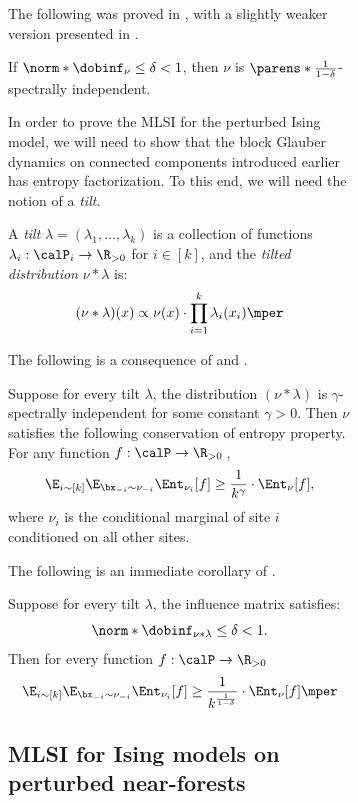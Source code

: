\documentclass[11pt,letterpaper]{article}
\begin{document}
\begin{figure}
\begin{figure}
The following was proved in \cite{AJKPV24}, with a slightly weaker version presented in \cite{Liu21,BCCPSV22}.
\begin{theorem}    \label{thm:dobrushin-to-specind}
    If $\norm*{\dobinf_{\nu}} \le \delta < 1$, then $\nu$ is $\parens*{\frac{1}{1-\delta}}$-spectrally independent.
\end{theorem}

In order to prove the MLSI for the perturbed Ising model, we will need to show that the block Glauber dynamics on connected components introduced earlier has entropy factorization. 
To this end, we will need the notion of a \emph{tilt}.
\begin{definition}[Tilts]
    A \emph{tilt} $\lambda = (\lambda_1,\dots,\lambda_k)$ is a collection of functions $\lambda_i:\calP_i\to\R_{> 0}$ for $i \in [k]$, and the \emph{tilted distribution} $\nu\ast\lambda$ is:
    \[
        (\nu\ast\lambda)(x) \propto \nu(x)\cdot \prod_{i=1}^k \lambda_i(x_i)\mper
    \]
\end{definition}

The following is a consequence of \cite[Theorem 4 and Theorem 5]{AJKPV21a} and \cite[Proposition 20 and Remark 70]{AASV21}.
\begin{lemma}   \label{thm:specind-to-entind}
    Suppose for every tilt $\lambda$, the distribution $(\nu\ast\lambda)$ is $\gamma$-spectrally independent for some constant $\gamma > 0$. Then $\nu$ satisfies the following conservation of entropy property.
    For any function $f:\calP\to\R_{> 0}$\,,
    \[
        \E_{i\sim[k]}\E_{\bx_{-i}\sim\nu_{-i}} \Ent_{\nu_i}[f] \ge \frac{1}{k^{\gamma}}\cdot\Ent_{\nu}[f],
    \]
    where $\nu_i$ is the conditional marginal of site $i$ conditioned on all other sites.
\end{lemma}

The following is an immediate corollary of .
\begin{corollary}   \label{cor:entind-dob}
    Suppose for every tilt $\lambda$, the influence matrix satisfies:
    \[
        \norm*{\dobinf_{\nu\ast\lambda}} \le \delta < 1.
    \]
    Then for every function $f:\calP\to\R_{> 0}$\mcom
    \[
        \E_{i\sim[k]}\E_{\bx_{-i}\sim\nu_{-i}} \Ent_{\nu_i}[f] \ge \frac{1}{k^{\frac{1}{1-\delta}}}\cdot\Ent_{\nu}[f]\mper
    \]
\end{corollary}

\subsection{MLSI for Ising models on perturbed near-forests} \label{sec:perturbed-near-forest}


\end{figure}
\end{figure}
\end{document}
